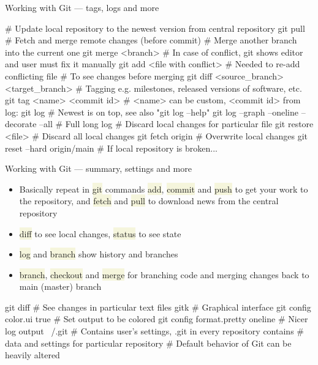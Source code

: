 \documentclass[compress, xelatex, 11pt, xcolor=svgnames, aspectratio=169, url={hyphens, lowtilde}]{beamer}
\renewcommand{\texttt}[1]{\colorbox{Beige}{{\ttfamily #1}}}
\begin{document}
\begin{frame}[fragile]{Working with Git --- tags, logs and more}
	\begin{bashcode}
    # Update local repository to the newest version from central repository
    git pull # Fetch and merge remote changes (before commit)
    # Merge another branch into the current one
    git merge <branch>
    # In case of conflict, git shows editor and user must fix it manually
    git add <file with conflict> # Needed to re-add conflicting file
    # To see changes before merging
    git diff <source_branch> <target_branch>
    # Tagging e.g. milestones, released versions of software, etc.
    git tag <name> <commit id> # <name> can be custom, <commit id> from log:
    git log # Newest is on top, see also "git log --help"
    git log --graph --oneline --decorate --all # Full long log
    # Discard local changes for particular file
    git restore <file>
    # Discard all local changes
    git fetch origin # Overwrite local changes
    git reset --hard origin/main # If local repository is broken...
	\end{bashcode}
\end{frame}

\begin{frame}[fragile]{Working with Git --- summary, settings and more}
	\begin{itemize}
		\item Basically repeat in \texttt{git} commands \texttt{add}, \texttt{commit} and \texttt{push} to get your work to the repository, and \texttt{fetch} and \texttt{pull} to download news from the central repository
		\item \texttt{diff} to see local changes, \texttt{status} to see state
		\item \texttt{log} and \texttt{branch} show history and branches
		\item \texttt{branch}, \texttt{checkout} and \texttt{merge} for branching code and merging changes back to main (master) branch
	\end{itemize}
	\begin{bashcode}
    git diff # See changes in particular text files
    gitk # Graphical interface
    git config color.ui true # Set output to be colored
    git config format.pretty oneline # Nicer log output
    ~/.git # Contains user's settings, .git in every repository contains
           # data and settings for particular repository
           # Default behavior of Git can be heavily altered
	\end{bashcode}
\end{frame}
\end{document}
